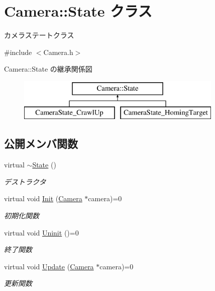 \hypertarget{class_camera_1_1_state}{}\section{Camera\+:\+:State クラス}
\label{class_camera_1_1_state}


カメラステートクラス  




{\ttfamily \#include $<$Camera.\+h$>$}

Camera\+:\+:State の継承関係図\begin{figure}[H]
\begin{center}
\leavevmode
\includegraphics[height=2.000000cm]{class_camera_1_1_state}
\end{center}
\end{figure}
\subsection*{公開メンバ関数}
\begin{DoxyCompactItemize}
\item 
virtual \mbox{\hyperlink{class_camera_1_1_state_a61b74bb711d49e26c0f07af65fb74eb9}{$\sim$\+State}} ()
\begin{DoxyCompactList}\small\item\em デストラクタ \end{DoxyCompactList}\item 
virtual void \mbox{\hyperlink{class_camera_1_1_state_aa1b81471ab15e64b3117ffe7de9560ff}{Init}} (\mbox{\hyperlink{class_camera}{Camera}} $\ast$camera)=0
\begin{DoxyCompactList}\small\item\em 初期化関数 \end{DoxyCompactList}\item 
virtual void \mbox{\hyperlink{class_camera_1_1_state_adb3f43b6c3f8100da7877867180e804b}{Uninit}} ()=0
\begin{DoxyCompactList}\small\item\em 終了関数 \end{DoxyCompactList}\item 
virtual void \mbox{\hyperlink{class_camera_1_1_state_a2d41e0cb783666bae6c6ea167fcc7874}{Update}} (\mbox{\hyperlink{class_camera}{Camera}} $\ast$camera)=0
\begin{DoxyCompactList}\small\item\em 更新関数 \end{DoxyCompactList}\end{DoxyCompactItemize}


